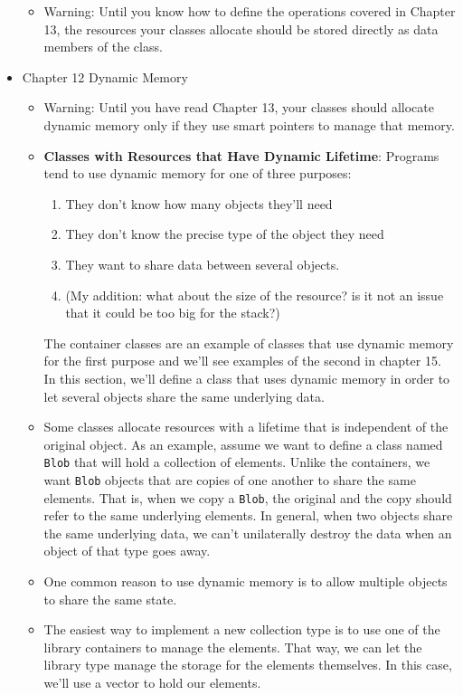 \documentclass[twoside,english]{uiofysmaster}
\begin{document}
\begin{itemize}
\begin{itemize}
		\item Warning: Until you know how to define the operations covered in Chapter 13, the resources your classes allocate should be stored directly as data members of the class.
	\end{itemize}
	\item Chapter 12 Dynamic Memory
	\begin{itemize}
		\item Warning: Until you have read Chapter 13, your classes should allocate dynamic memory only if they use smart pointers to manage that memory.
		\item \textbf{Classes with Resources that Have Dynamic Lifetime}: Programs tend to use dynamic memory for one of three purposes:
		\begin{enumerate}
			\item They don't know how many objects they'll need
			\item They don't know the precise type of the object they need
			\item They want to share data between several objects.
			\item (My addition: what about the size of the resource? is it not an issue that it could be too big for the stack?)
		\end{enumerate}
		The container classes are an example of classes that use dynamic memory for the first purpose and we'll see examples of the second in chapter 15. In this section, we'll define a class that uses dynamic memory in order to let several objects share the same underlying data.
		\item Some classes allocate resources with a lifetime that is independent of the original object. As an example, assume we want to define a class named \texttt{Blob} that will hold a collection of elements. Unlike the containers, we want \texttt{Blob} objects that are copies of one another to share the same elements. That is, when we copy a \texttt{Blob}, the original and the copy should refer to the same underlying elements.
		In general, when two objects share the same underlying data, we can’t unilaterally destroy the data when an object of that type goes away.
		\item One common reason to use dynamic memory is to allow multiple objects to share the same state.
		\item The easiest way to implement a new collection type is to use one of the library containers to manage the elements. That way, we can let the library type manage the storage for the elements themselves. In this case, we’ll use a vector to hold our elements.

\end{itemize}
\end{itemize}
\end{document}
